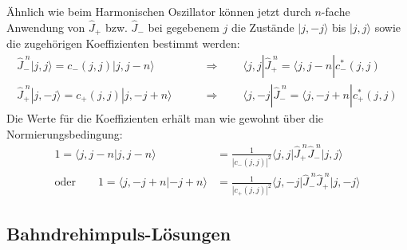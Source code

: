 \documentclass[9pt]{report}
\begin{document}
Ähnlich wie beim Harmonischen Oszillator können jetzt durch $n$-fache Anwendung von $\hat{J}_{+}$ bzw. $\hat{J}_{-}$ bei gegebenem $j$ die Zustände $|j,-j\rangle$ bis $|j,j\rangle$ sowie die zugehörigen Koeffizienten bestimmt werden:
\begin{align}
\hat{J}_{-}^{\;n}|j,j\rangle = c_{-}(j,j)|j,j-n\rangle\qquad &\Rightarrow\qquad\langle j,j|\hat{J}_{+}^{\;n} = \langle j,j-n|c_{-}^{*}(j,j)\\
\hat{J}_{+}^{\;n}|j,-j\rangle = c_{+}(j,j)|j,-j+n\rangle\qquad &\Rightarrow\qquad\langle j,-j|\hat{J}_{-}^{\;n} = \langle j,-j+n|c_{+}^{*}(j,j)
\end{align}
Die Werte für die Koeffizienten erhält man wie gewohnt über die Normierungsbedingung:
\begin{align}
1=\langle j,j-n|j,j-n\rangle &= \frac{1}{|c_{-}(j,j)|^2}\big\langle j,j\big|\hat{J}_{+}^{\;n}\hat{J}_{-}^{\;n}\big|j,j\big\rangle\\
\mathrm{oder}\qquad 1=\langle j,-j+n|-j+n\rangle &= \frac{1}{|c_{+}(j,j)|^2}\big\langle j,-j\big|\hat{J}_{-}^{\;n}\hat{J}_{+}^{\;n}\big|j,-j\big\rangle
\end{align}



\subsection{Bahndrehimpuls-Lösungen}
\end{document}
